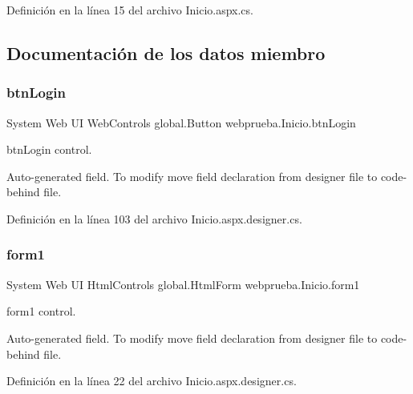 Definición en la línea 15 del archivo Inicio.\+aspx.\+cs.


\begin{DoxyCode}{0}

\end{DoxyCode}


\subsection{Documentación de los datos miembro}
\mbox{\label{classwebprueba_1_1_inicio_a49b6bf4ee7fb44110630737302b382b2}} 
\subsubsection{\texorpdfstring{btnLogin}{btnLogin}}
{\footnotesize\ttfamily System Web UI Web\+Controls global.\+Button webprueba.\+Inicio.\+btn\+Login\hspace{0.3cm}{\ttfamily [protected]}}



btn\+Login control. 

Auto-\/generated field. To modify move field declaration from designer file to code-\/behind file. 

Definición en la línea 103 del archivo Inicio.\+aspx.\+designer.\+cs.

\mbox{\label{classwebprueba_1_1_inicio_a768017299cb17002e414ba64833c0426}} 
\subsubsection{\texorpdfstring{form1}{form1}}
{\footnotesize\ttfamily System Web UI Html\+Controls global.\+Html\+Form webprueba.\+Inicio.\+form1\hspace{0.3cm}{\ttfamily [protected]}}



form1 control. 

Auto-\/generated field. To modify move field declaration from designer file to code-\/behind file. 

Definición en la línea 22 del archivo Inicio.\+aspx.\+designer.\+cs.

